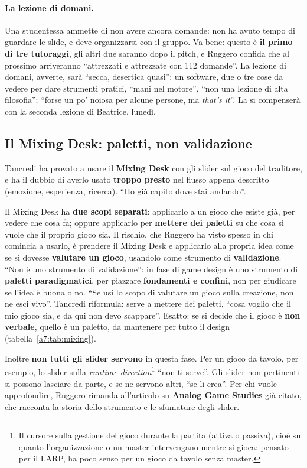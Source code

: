 \paragraph{La lezione di domani.} Una studentessa ammette di non avere ancora domande:
non ha avuto tempo di guardare le slide, e deve organizzarsi con il gruppo. Va bene:
questo è \textbf{il primo di tre tutoraggi}, gli altri due saranno dopo il pitch, e
Ruggero confida che al prossimo arriveranno ``attrezzati e attrezzate con 112
domande''. La lezione di domani, avverte, sarà ``secca, desertica quasi'': un
software, due o tre cose da vedere per dare strumenti pratici, ``mani nel motore'',
``non una lezione di alta filosofia''; ``forse un po' noiosa per alcune persone, ma
\emph{that's it}''. La si compenserà con la seconda lezione di Beatrice, lunedì.

\subsection{Il Mixing Desk: paletti, non validazione}
\label{a7:sec:tut-mixing}

Tancredi ha provato a usare il \textbf{Mixing Desk} con gli slider sul gioco del
traditore, e ha il dubbio di averlo usato \textbf{troppo presto} nel flusso appena
descritto (emozione, esperienza, ricerca). ``Ho già capito dove stai andando''.

Il Mixing Desk ha \textbf{due scopi separati}: applicarlo a un gioco che esiste già,
per vedere che cosa fa; oppure applicarlo per \textbf{mettere dei paletti} su che cosa
si vuole che il proprio gioco sia. Il rischio, che Ruggero ha visto spesso in chi
comincia a usarlo, è prendere il Mixing Desk e applicarlo alla propria idea come se si
dovesse \textbf{valutare un gioco}, usandolo come strumento di
\textbf{validazione}. ``Non è uno strumento di validazione'': in fase di game design è
uno strumento di \textbf{paletti paradigmatici}, per piazzare \textbf{fondamenti e
confini}, non per giudicare se l'idea è buona o no. ``Se usi lo scopo di valutare un
gioco sulla creazione, non ne esci vivo''. Tancredi riformula: serve a mettere dei
paletti, ``cosa voglio che il mio gioco sia, e da qui non devo scappare''. Esatto: se
si decide che il gioco è \textbf{non verbale}, quello è un paletto, da mantenere per
tutto il design (tabella~\ref{a7:tab:mixing}).

Inoltre \textbf{non tutti gli slider servono} in questa fase. Per un gioco da tavolo,
per esempio, lo slider sulla \emph{runtime direction}\footnote{Il cursore sulla
gestione del gioco durante la partita (attiva o passiva), cioè su quanto
l'organizzazione o un master intervengano mentre si gioca: pensato per il LARP, ha
poco senso per un gioco da tavolo senza master.} ``non ti serve''. Gli slider non
pertinenti si possono lasciare da parte, e se ne servono altri, ``se li crea''. Per
chi vuole approfondire, Ruggero rimanda all'articolo su \textbf{Analog Game Studies}
già citato, che racconta la storia dello strumento e le sfumature degli slider.

